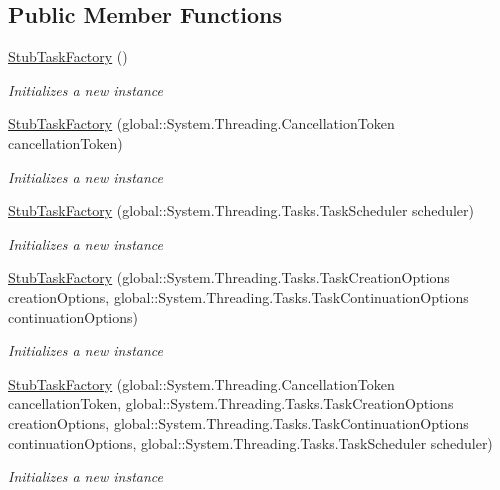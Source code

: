 \subsection*{Public Member Functions}
\begin{DoxyCompactItemize}
\item 
\hyperlink{class_system_1_1_threading_1_1_tasks_1_1_fakes_1_1_stub_task_factory_a7752caf03b11e26090e3b14bd22a7aea}{Stub\-Task\-Factory} ()
\begin{DoxyCompactList}\small\item\em Initializes a new instance\end{DoxyCompactList}\item 
\hyperlink{class_system_1_1_threading_1_1_tasks_1_1_fakes_1_1_stub_task_factory_a10f215a2cfdcb7bd88dd5db182c09271}{Stub\-Task\-Factory} (global\-::\-System.\-Threading.\-Cancellation\-Token cancellation\-Token)
\begin{DoxyCompactList}\small\item\em Initializes a new instance\end{DoxyCompactList}\item 
\hyperlink{class_system_1_1_threading_1_1_tasks_1_1_fakes_1_1_stub_task_factory_a3bf92d99542f9da7c02ed53547d62140}{Stub\-Task\-Factory} (global\-::\-System.\-Threading.\-Tasks.\-Task\-Scheduler scheduler)
\begin{DoxyCompactList}\small\item\em Initializes a new instance\end{DoxyCompactList}\item 
\hyperlink{class_system_1_1_threading_1_1_tasks_1_1_fakes_1_1_stub_task_factory_a55bcdda9f993e958317d2b9e83fa22e9}{Stub\-Task\-Factory} (global\-::\-System.\-Threading.\-Tasks.\-Task\-Creation\-Options creation\-Options, global\-::\-System.\-Threading.\-Tasks.\-Task\-Continuation\-Options continuation\-Options)
\begin{DoxyCompactList}\small\item\em Initializes a new instance\end{DoxyCompactList}\item 
\hyperlink{class_system_1_1_threading_1_1_tasks_1_1_fakes_1_1_stub_task_factory_a0c7972e984564da3350ae11c3d40841d}{Stub\-Task\-Factory} (global\-::\-System.\-Threading.\-Cancellation\-Token cancellation\-Token, global\-::\-System.\-Threading.\-Tasks.\-Task\-Creation\-Options creation\-Options, global\-::\-System.\-Threading.\-Tasks.\-Task\-Continuation\-Options continuation\-Options, global\-::\-System.\-Threading.\-Tasks.\-Task\-Scheduler scheduler)
\begin{DoxyCompactList}\small\item\em Initializes a new instance\end{DoxyCompactList}\end{DoxyCompactItemize}

